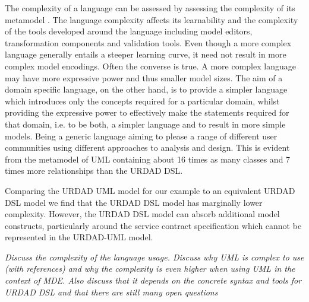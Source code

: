 The complexity of a language can be assessed by assessing the complexity of its metamodel \cite{mohagheghi_evaluating_2007}. The language complexity affects its learnability and the complexity of the tools developed around the language including model editors, transformation components and validation tools. Even though a more complex language generally entails a steeper learning curve, it need not result in more complex model encodings. Often the converse is true. A more complex language may have more expressive power and thus smaller model sizes. The aim of a domain specific language, on the other hand, is to provide a simpler language which introduces only the concepts required for a particular domain, whilst providing the expressive power to effectively make the statements required for that domain, i.e. to be both, a simpler language and to result in more simple models. Being a generic language aiming to please a range of different user communities using different approaches to analysis and design. This is evident from the metamodel of UML containing about 16 times as many classes and 7 times more relationships than the URDAD DSL.

Comparing the URDAD UML model for our example to an equivalent URDAD DSL model we find that the URDAD DSL model has marginally lower complexity. However, the URDAD DSL model can absorb additional model constructs, particularly around the service contract specification which cannot be represented in the URDAD-UML model.

\emph{Discuss the complexity of the language usage. Discuss why UML is complex to use (with references) and why the complexity is even higher when using UML in the context of MDE. Also discuss that it depends on the concrete syntax and tools for URDAD DSL and that there are still many open questions}
